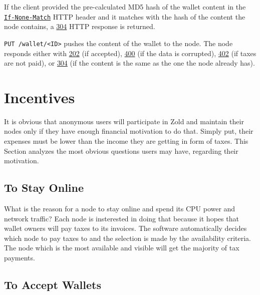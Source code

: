 \documentclass[11pt,oneside]{article}
\newcommand\dd[1]{\colorbox{gray!30}{\texttt{#1}}}
\begin{document}
If the client provided the pre-calculated MD5 hash of the wallet content in the
\href{https://www.w3.org/Protocols/rfc2616/rfc2616-sec14.html#sec14.26}{\dd{If-None-Match}}
HTTP header and it matches with the hash of the
content the node contains, a
\href{https://www.w3.org/Protocols/rfc2616/rfc2616-sec10.html#sec10.3.5}{304} HTTP response is returned.

\dd{PUT /wallet/<ID>} pushes the content of the wallet to the node. The
node responds either with
\href{https://www.w3.org/Protocols/rfc2616/rfc2616-sec10.html#sec10.2.3}{202} (if accepted),
\href{https://www.w3.org/Protocols/rfc2616/rfc2616-sec10.html#sec10.4.1}{400} (if the data is corrupted),
\href{https://www.w3.org/Protocols/rfc2616/rfc2616-sec10.html#sec10.4.3}{402} (if taxes are not paid),
or
\href{https://www.w3.org/Protocols/rfc2616/rfc2616-sec10.html#sec10.3.5}{304}
(if the content is the same as the one the node already has).

\section{Incentives}

It is obvious that anonymous users will participate in Zold and maintain
their nodes only if they have enough financial motivation to do that. Simply
put, their expenses must be lower than the income they are getting in
form of taxes. This Section analyzes the most obvious questions users
may have, regarding their motivation.

\subsection{To Stay Online}

What is the reason for a node to stay online and spend its CPU power
and network traffic? Each node is insterested in doing that because it
hopes that wallet owners will pay taxes to its invoices. The software
automatically decides which node to pay taxes to and the selection is
made by the availability criteria. The node which is the most available
and visible will get the majority of tax payments.

\subsection{To Accept Wallets}
\end{document}
